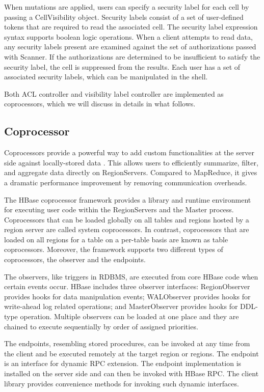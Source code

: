 \documentclass[11pt]{book}
\begin{document}
When mutations are applied, users can specify a security label for each cell by passing a CellVisibility object. Security labels consist of a set of user-defined tokens that are required to read the associated cell. The security label expression syntax supports boolean logic operations. When a client attempts to read data, any security labels present are examined against the set of authorizations passed with Scanner. If the authorizations are determined to be insufficient to satisfy the security label, the cell is suppressed from the results. Each user has a set of associated security labels, which can be manipulated in the shell.

Both ACL controller and visibility label controller are implemented as coprocessors, which we will discuss in details in what follows.

\subsection{Coprocessor}

Coprocessors provide a powerful way to add custom functionalities at the server side against locally-stored data \cite{HBaseCoprocessor}. This allows users to efficiently summarize, filter, and aggregate data directly on RegionServers. Compared to MapReduce, it gives a dramatic performance improvement by removing communication overheads. 

The HBase coprocessor framework provides a library and runtime environment for executing user code within the RegionServers and the Master process. Coprocessors that can be loaded globally on all tables and regions hosted by a region server are called system coprocessors. In contrast, coprocessors that are loaded on all regions for a table on a per-table basis are known as table coprocessors. Moreover, the framework supports two different types of coprocessors, the observer and the endpoints.

The observers, like triggers in RDBMS, are executed from core HBase code when certain events occur. HBase includes three observer interfaces: RegionObserver provides hooks for data manipulation events; WALObserver provides hooks for write-ahead log related operations; and MasterObserver provides hooks for DDL-type operation. Multiple observers can be loaded at one place and they are chained to execute sequentially by order of assigned priorities.

The endpoints, resembling stored procedures, can be invoked at any time from the client and be executed remotely at the target region or regions. The endpoint is an interface for dynamic RPC extension. The endpoint implementation is installed on the server side and can then be invoked with HBase RPC. The client library provides convenience methods for invoking such dynamic interfaces.
\end{document}
